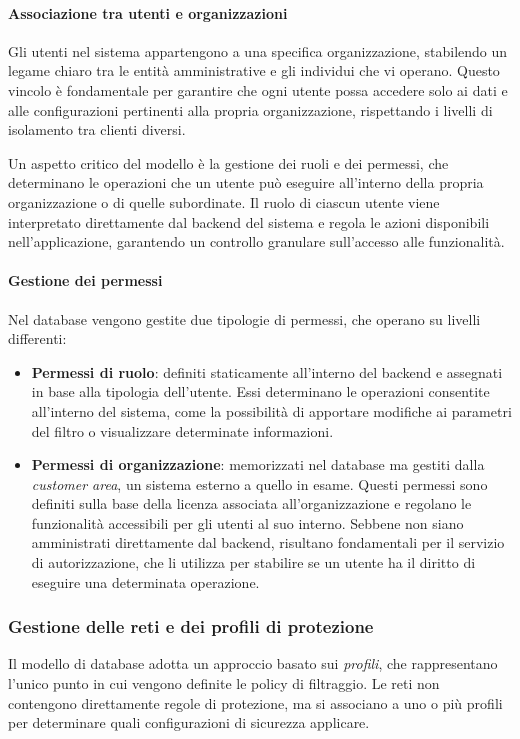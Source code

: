 \paragraph{Associazione tra utenti e organizzazioni}
Gli utenti nel sistema appartengono a una specifica organizzazione, stabilendo un legame chiaro tra le entità amministrative e gli individui che vi operano. Questo vincolo è fondamentale per garantire che ogni utente possa accedere solo ai dati e alle configurazioni pertinenti alla propria organizzazione, rispettando i livelli di isolamento tra clienti diversi.

Un aspetto critico del modello è la gestione dei ruoli e dei permessi, che determinano le operazioni che un utente può eseguire all’interno della propria organizzazione o di quelle subordinate. Il ruolo di ciascun utente viene interpretato direttamente dal backend del sistema e regola le azioni disponibili nell’applicazione, garantendo un controllo granulare sull’accesso alle funzionalità.

\paragraph{Gestione dei permessi}
Nel database vengono gestite due tipologie di permessi, che operano su livelli differenti:
\begin{itemize}
  \item \textbf{Permessi di ruolo}: definiti staticamente all'interno del backend e assegnati in base alla tipologia dell’utente. Essi determinano le operazioni consentite all’interno del sistema, come la possibilità di apportare modifiche ai parametri del filtro o visualizzare determinate informazioni.
  \item \textbf{Permessi di organizzazione}: memorizzati nel database ma gestiti dalla \textit{customer area}, un sistema esterno a quello in esame. Questi permessi sono definiti sulla base della licenza associata all'organizzazione e regolano le funzionalità accessibili per gli utenti al suo interno. Sebbene non siano amministrati direttamente dal backend, risultano fondamentali per il servizio di autorizzazione, che li utilizza per stabilire se un utente ha il diritto di eseguire una determinata operazione.
\end{itemize}

\subsubsection{Gestione delle reti e dei profili di protezione}
Il modello di database adotta un approccio basato sui \emph{profili}, che rappresentano l’unico punto in cui vengono definite le policy di filtraggio. Le reti non contengono direttamente regole di protezione, ma si associano a uno o più profili per determinare quali configurazioni di sicurezza applicare.

